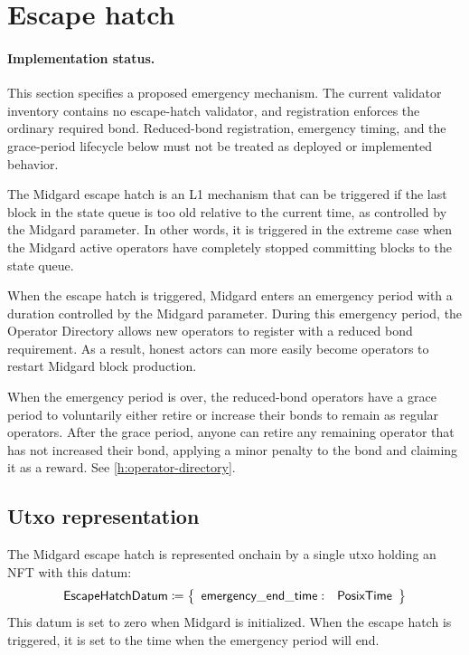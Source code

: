 \documentclass[../midgard.tex]{subfiles}
\begin{document}
\section{Escape hatch}
\label{h:escape-hatch}

\paragraph{Implementation status.} This section specifies a proposed emergency mechanism. The current validator inventory contains no escape-hatch validator, and registration enforces the ordinary required bond. Reduced-bond registration, emergency timing, and the grace-period lifecycle below must not be treated as deployed or implemented behavior.

The Midgard escape hatch is an L1 mechanism that can be triggered if the last block in the state queue is too old relative to the current time, as controlled by the Midgard  parameter.
In other words, it is triggered in the extreme case when the Midgard active operators have completely stopped committing blocks to the state queue.

When the escape hatch is triggered, Midgard enters an emergency period with a duration controlled by the Midgard  parameter.
During this emergency period, the Operator Directory allows new operators to register with a reduced bond requirement.
As a result, honest actors can more easily become operators to restart Midgard block production.

When the emergency period is over, the reduced-bond operators have a grace period to voluntarily either retire or increase their bonds to remain as regular operators.
After the grace period, anyone can retire any remaining operator that has not increased their bond, applying a minor penalty to the bond and claiming it as a reward.
See \cref{h:operator-directory}.

\subsection{Utxo representation}%
\label{h:escape-hatch-utxo-representation}%

The Midgard escape hatch is represented onchain by a single utxo holding an NFT with this datum:
\begin{equation*}
  \mathsf{EscapeHatchDatum} \coloneq \left\{
  \begin{array}{ll}
    \mathsf{emergency\_end\_time}: & \mathsf{PosixTime}
  \end{array}\right\}
\end{equation*}
This datum is set to zero when Midgard is initialized.
When the escape hatch is triggered, it is set to the time when the emergency period will end.
\end{document}
